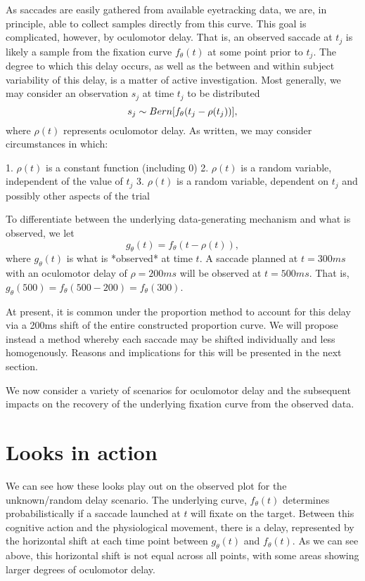 \documentclass{article}
\begin{document}
As saccades are easily gathered from available eyetracking data, we are, in principle, able to collect samples directly from this curve. This goal is complicated, however, by oculomotor delay. That is, an observed saccade at $t_j$ is likely a sample from the fixation curve $f_{\theta}(t)$ at some point prior to $t_j$. The degree to which this delay occurs, as well as the between and within subject variability of this delay, is a matter of active investigation. Most generally, we may consider an observation $s_j$ at time $t_j$ to be distributed
$$
s_j \sim  Bern \large[f_{\theta}(t_j - \rho(t_j)) \large],
$$ 
where $\rho(t)$ represents oculomotor delay. As written, we may consider circumstances in which:

1.  $\rho(t)$ is a constant function (including 0)
2.  $\rho(t)$ is a random variable, independent of the value of $t_j$
3.  $\rho(t)$ is a random variable, dependent on $t_j$ and possibly other aspects of the trial

To differentiate between the underlying data-generating mechanism and what is observed, we let
$$
g_{\theta}(t) = f_{\theta}(t - \rho(t)), 
$$
where $g_{\theta}(t)$ is what is *observed* at time $t$. A saccade planned at $t = 300ms$ with an oculomotor delay of $\rho = 200ms$ will be observed at $t = 500ms$. That is, $g_{\theta}(500) = f_{\theta}(500 - 200) = f_{\theta}(300)$.

At present, it is common under the proportion method to account for this delay via a 200ms shift of the entire constructed proportion curve. We will propose instead a method whereby each saccade may be shifted individually and less homogenously. Reasons and implications for this will be presented in the next section.

We now consider a variety of scenarios for oculomotor delay and the subsequent impacts on the recovery of the underlying fixation curve from the observed data.

\section{Looks in action}


We can see how these looks play out on the observed plot for the unknown/random delay scenario. The underlying curve, $f_{\theta}(t)$ determines probabilistically if a saccade launched at $t$ will fixate on the target. Between this cognitive action and the physiological movement, there is a delay, represented by the horizontal shift at each time point between $g_{\theta}(t)$ and $f_{\theta}(t)$. As we can see above, this horizontal shift is not equal across all points, with some areas showing larger degrees of oculomotor delay.
\end{document}
